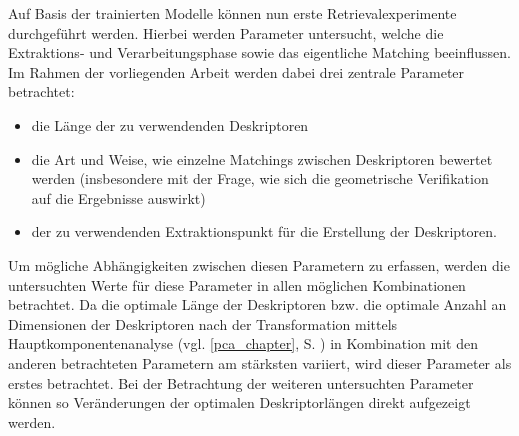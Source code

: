 Auf Basis der trainierten Modelle können nun erste Retrievalexperimente durchgeführt werden. Hierbei werden Parameter untersucht, welche die Extraktions- und Verarbeitungsphase sowie das eigentliche Matching beeinflussen. Im Rahmen der vorliegenden Arbeit werden dabei drei zentrale Parameter betrachtet:
\begin{itemize}
	\item die Länge der zu verwendenden Deskriptoren
	\item die Art und Weise, wie einzelne Matchings zwischen Deskriptoren bewertet werden (insbesondere mit der Frage, wie sich die geometrische Verifikation auf die Ergebnisse auswirkt)
	\item der zu verwendenden Extraktionspunkt für die Erstellung der Deskriptoren.
\end{itemize}
Um mögliche Abhängigkeiten zwischen diesen Parametern zu erfassen, werden die untersuchten Werte für diese Parameter in allen möglichen Kombinationen betrachtet. Da die optimale Länge der Deskriptoren bzw. die optimale Anzahl an Dimensionen der Deskriptoren nach der Transformation mittels Hauptkomponentenanalyse (vgl. \ref{pca_chapter}, S. \pageref{pca_chapter}) in Kombination mit den anderen betrachteten Parametern am stärksten variiert, wird dieser Parameter als erstes betrachtet. Bei der Betrachtung der weiteren untersuchten Parameter können so Veränderungen der optimalen Deskriptorlängen direkt aufgezeigt werden.\\
